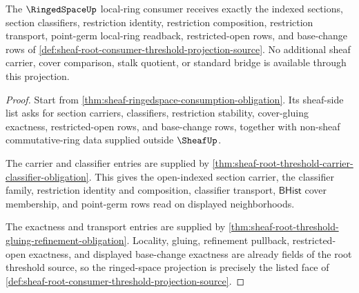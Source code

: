 \begin{theorem}
\label{thm:sheaf-root-consumer-ringedspace-projection}
The $\RingedSpaceUp$ local-ring consumer receives exactly the indexed sections, section classifiers, restriction identity, restriction composition, restriction transport, point-germ local-ring readback, restricted-open rows, and base-change rows of \autoref{def:sheaf-root-consumer-threshold-projection-source}. No additional sheaf carrier, cover comparison, stalk quotient, or standard bridge is available through this projection.
\end{theorem}
\begin{proof}
Start from \autoref{thm:sheaf-ringedspace-consumption-obligation}. Its sheaf-side list asks for section carriers, classifiers, restriction stability, cover-gluing exactness, restricted-open rows, and base-change rows, together with non-sheaf commutative-ring data supplied outside $\SheafUp$.

The carrier and classifier entries are supplied by \autoref{thm:sheaf-root-threshold-carrier-classifier-obligation}. This gives the open-indexed section carrier, the classifier family, restriction identity and composition, classifier transport, $\mathsf{BHist}$ cover membership, and point-germ rows read on displayed neighborhoods.

The exactness and transport entries are supplied by \autoref{thm:sheaf-root-threshold-gluing-refinement-obligation}. Locality, gluing, refinement pullback, restricted-open exactness, and displayed base-change exactness are already fields of the root threshold source, so the ringed-space projection is precisely the listed face of \autoref{def:sheaf-root-consumer-threshold-projection-source}.
\end{proof}

